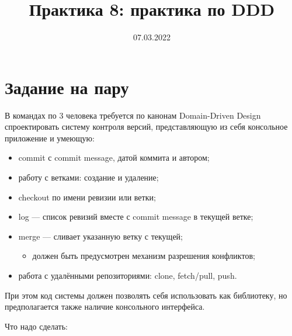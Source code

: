 \documentclass[a5paper]{article}
\title{Практика 8: практика по DDD}
\author{}
\date{07.03.2022}
\begin{document}
\maketitle
\thispagestyle{empty}

\section{Задание на пару}

В командах по 3 человека требуется по канонам Domain-Driven Design спроектировать систему контроля версий, представляющую из себя консольное приложение и умеющую:

\begin{itemize}
    \item commit с commit message, датой коммита и автором;
    \item работу с ветками: создание и удаление;
    \item checkout по имени ревизии или ветки;
    \item log --- список ревизий вместе с commit message в текущей ветке;
    \item merge --- сливает указанную ветку с текущей;
    \begin{itemize}
        \item должен быть предусмотрен механизм разрешения конфликтов;
    \end{itemize}
    \item работа с удалёнными репозиториями: clone, fetch/pull, push.
\end{itemize}

При этом код системы должен позволять себя использовать как библиотеку, но предполагается также наличие консольного интерфейса.

Что надо сделать:
\end{document}
